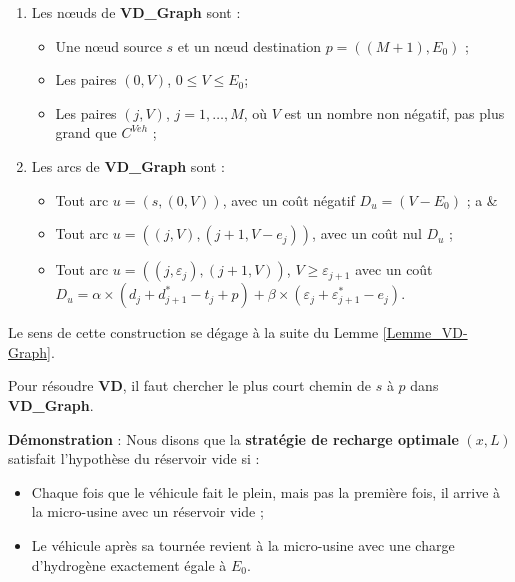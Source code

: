 \begin{enumerate}
	\item Les nœuds de \textbf{VD\_Graph} sont :
	\begin{itemize}[label=$\square$]
		\item Une nœud source $s$ et un nœud destination $p = ((M+1), E_0)$ ;
		\item Les paires $(0,V)$, $0 \leq V \leq E_0$;
		\item Les paires $(j,V)$, $j = 1,\dots, M$, où $V$ est un nombre non négatif, pas plus grand que $C^{Veh}$ ;
	\end{itemize}
	\item Les arcs de \textbf{VD\_Graph} sont :
	\begin{itemize}[label=$\square$]
		\item Tout arc $u = (s, (0, V))$, avec un coût négatif $D_u = (V- E_0)$ ; 
		a	&		\item Tout arc $u = ((j, V), (j+1, V- e_j))$, avec un coût nul $D_u$ ;
		\item Tout arc $u = ((j, \varepsilon_j), (j+1, V))$, $V \geq \varepsilon_{j+1}$ avec un coût $D_u= \alpha \times (d_j + d^*_{j+1} - t_j + p) + \beta \times (\varepsilon_j + \varepsilon^*_{j+1} - e_j)$.
	\end{itemize}
\end{enumerate}
Le sens de cette construction se dégage à la suite du Lemme \ref{Lemme_VD-Graph}. 
\begin{Lem}
	\label{Lemme_VD-Graph}
	Pour résoudre \textbf{VD}, il faut chercher le plus court chemin de $s$ à $p$ dans \textbf{VD\_Graph}.
\end{Lem}

\textbf{Démonstration} : Nous disons que la \textbf{stratégie de recharge optimale} $(x, L)$ satisfait l'hypothèse du réservoir vide si :
\begin{itemize}[label=$\square$]
	\item Chaque fois que le véhicule fait le plein, mais pas la première fois, il arrive à la micro-usine avec un réservoir vide ; 
	\item Le véhicule après sa tournée revient à la micro-usine avec une charge d'hydrogène exactement égale à $E_0$.
\end{itemize}

